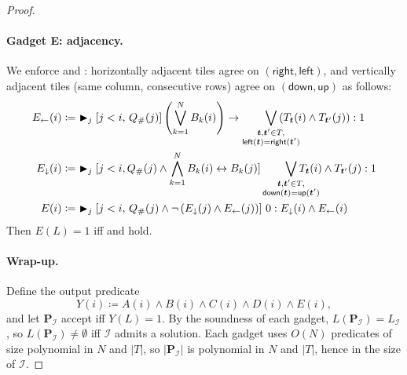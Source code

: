 \documentclass{article} %
\newcommand{\maxatt}{\blacktriangleright}
\newcommand{\tleft}{\mathsf{left}}
\newcommand{\tright}{\mathsf{right}}
\newcommand{\tup}{\mathsf{up}}
\newcommand{\tdown}{\mathsf{down}}
\newcommand{\bnfdef}{\coloneqq}
\newcommand{\sym}[1]{\mathrm{#1}}
\newcommand{\brasp}{\boldsymbol{P}}
\newcommand{\Qprop}[1]{Q_{#1}}
\newcommand{\Lang}{L}
\newcommand{\TI}{\mathcal{I}}
\newcommand{\tile}{\boldsymbol{t}}
\newcommand{\tileset}{T}
\begin{document}
\begin{proof}
\paragraph{Gadget E: adjacency.}
We enforce  and : horizontally adjacent tiles agree on $(\tright,\tleft)$, and vertically adjacent tiles (same column, consecutive rows) agree on $(\tdown,\tup)$ as follows:
\begin{subequations}\label{eq:gadget-E}
\begin{align}
E_\leftarrow(i) &\bnfdef\ \maxatt_j[j<i,\,\Qprop{\sym{\#}}(j)] \left(\bigvee_{k=1}^N B_k(i)\right) \to \smashoperator[r]{\bigvee_{\substack{\tile,\tile' \in \tileset, \\ \tleft(\tile) = \tright(\tile')}}}  \left(T_{\tile}(i) \wedge T_{\tile'}(j)\right) : 1 \label{eq:E-left}\\
E_\downarrow(i) &\bnfdef\ \maxatt_j[j<i,\Qprop{\sym{\#}}(j) \wedge \bigwedge_{k=1}^N B_k(i) \leftrightarrow B_k(j)] \smashoperator[r]{\bigvee_{\substack{\tile,\tile' \in \tileset, \\ \tdown(\tile) = \tup(\tile')}}} T_{\tile}(i) \wedge T_{\tile'}(j) : 1 \label{eq:E-down}\\
E(i) &\bnfdef\ \maxatt_j[j<i,\, \Qprop{\sym{\#}}(j) \wedge \neg\left(E_\downarrow(j) \wedge E_\leftarrow(j)\right)]\ 0 : E_\downarrow(i) \wedge E_\leftarrow(i) \label{eq:E-final}
\end{align}
\end{subequations}
Then $E(L) = 1$ iff  and  hold.

\paragraph{Wrap-up.}
Define the output predicate
\begin{equation}
Y(i) \bnfdef A(i) \wedge B(i) \wedge C(i) \wedge D(i) \wedge E(i),
\end{equation}
and let $\brasp_\TI$ accept iff $Y(L) = 1$. By the soundness of each gadget, $\Lang(\brasp_\TI) = \Lang_\TI$, so $\Lang(\brasp_\TI) \ne \emptyset$ iff $\TI$ admits a solution. Each gadget uses $O(N)$ predicates of size polynomial in $N$ and $|\tileset|$, so $|\brasp_\TI|$ is polynomial in $N$ and $|\tileset|$, hence in the size of $\TI$.
\end{proof}
\end{document}
